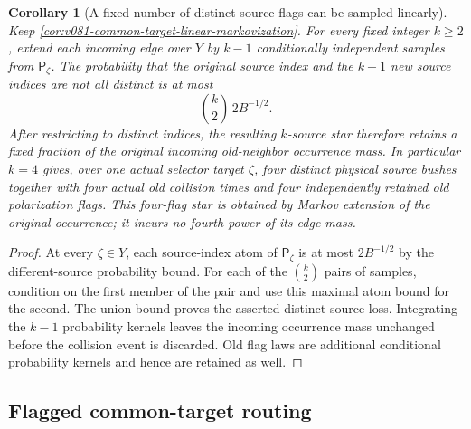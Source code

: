 \documentclass[10pt]{article}
\newtheorem{corollary}[theorem]{Corollary}
\begin{document}
\begin{corollary}[A fixed number of distinct source flags can be sampled linearly]
\label{cor:v081-common-target-four-source-star}
Keep \cref{cor:v081-common-target-linear-markovization}.  For every fixed integer \(k\ge2\), extend
each incoming edge over \(Y\) by \(k-1\) conditionally independent samples from
\(\mathsf P_\zeta\).  The probability that the original source index and the \(k-1\) new source
indices are not all distinct is at most
\begin{equation}
\label{eq:v081-common-target-distinct-loss}
\binom{k}{2}\,2B^{-1/2}.
\end{equation}
After restricting to distinct indices, the resulting \(k\)-source star therefore retains a fixed
fraction of the original incoming old-neighbor occurrence mass.  In particular \(k=4\) gives, over
one actual selector target \(\zeta\), four distinct physical source bushes together with four actual
old collision times and four independently retained old polarization flags.  This four-flag star
is obtained by Markov extension of the original occurrence; it incurs no fourth power of its edge
mass.
\end{corollary}

\begin{proof}
At every \(\zeta\in Y\), each source-index atom of
\(\mathsf P_\zeta\) is at most \(2B^{-1/2}\) by the different-source probability bound.  For each of the
\(\binom{k}{2}\) pairs of samples, condition on the first member of the pair and use this maximal
atom bound for the second.  The union bound proves the asserted distinct-source loss.  Integrating
the \(k-1\) probability kernels leaves the
incoming occurrence mass unchanged before the collision event is discarded.  Old flag laws are
additional conditional probability kernels and hence are retained as well.
\end{proof}

\subsection{Flagged common-target routing}
\end{document}
